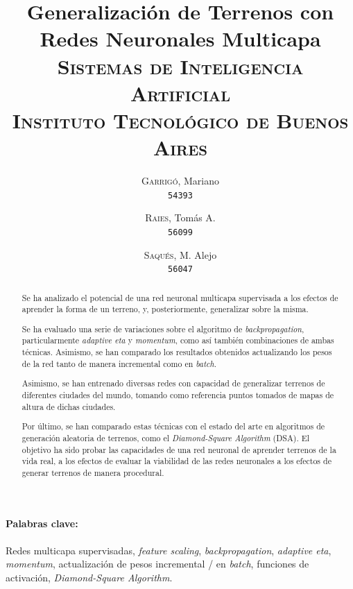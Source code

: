 \documentclass[12pt, twocolumn]{article}
\begin{document}
	\title{Generalización de Terrenos con Redes Neuronales Multicapa \\ 
		   \large{\textsc{Sistemas de Inteligencia Artificial}} \\
		   \normalsize{\textsc{Instituto Tecnológico de Buenos Aires}}}
	\author{
		\textsc{Garrigó}, Mariano \\
		\texttt{54393}
		\and
		\textsc{Raies}, Tomás A. \\
		\texttt{56099}
		\and
		\textsc{Saqués}, M. Alejo \\
		\texttt{56047} 
	}
	\date{}
	\maketitle
	
	\begin{abstract}
		Se ha analizado el potencial de una red neuronal multicapa supervisada a los efectos de aprender la forma de un terreno, y, posteriormente, generalizar sobre la misma.
		
		Se ha evaluado una serie de variaciones sobre el algoritmo de \textit{backpropagation}, particularmente \textit{adaptive eta} y \textit{momentum}, como así también combinaciones de ambas técnicas. Asimismo, se han comparado los resultados obtenidos actualizando los pesos de la red tanto de manera incremental como en \textit{batch}. 
		
		Asimismo, se han entrenado diversas redes con capacidad de generalizar terrenos de diferentes ciudades del mundo, tomando como referencia puntos tomados de mapas de altura de dichas ciudades.
		
		Por último, se han comparado estas técnicas con el estado del arte en algoritmos de generación aleatoria de terrenos, como el \textit{Diamond-Square Algorithm} (DSA). El objetivo ha sido probar las capacidades de una red neuronal de aprender terrenos de la vida real, a los efectos de evaluar la viabilidad de las redes neuronales a los efectos de generar terrenos de manera procedural. 
	\end{abstract}
	
	\paragraph{Palabras clave:} Redes multicapa supervisadas, \textit{feature scaling}, \textit{backpropagation}, \textit{adaptive eta}, \textit{momentum}, actualización de pesos incremental / en \textit{batch}, funciones de activación, \textit{Diamond-Square Algorithm}.
	
\end{document}
